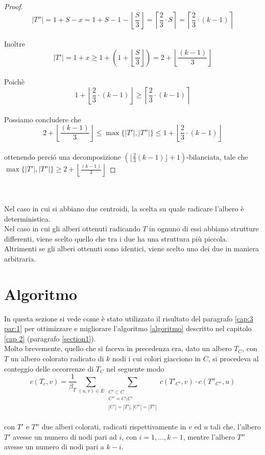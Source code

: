 \begin{proof}
\begin{equation}
|T''| = 1 + S - x = 1+S-1 - \left\lfloor \frac{S}{3}\right\rfloor = \left\lceil \frac{2}{3}\cdot S \right\rceil = \left\lceil \frac{2}{3} \cdot (k-1) \right\rceil 	
\end{equation}
\\
Inoltre
\\
\[ |T'| = 1+ x \ge 1+ (1 +  \left\lfloor \frac{S}{3}\right\rfloor ) = 2 +  \left\lfloor \frac{(k-1)}{3}\right\rfloor\]
\\
Poich\`e
\\
 	 \[1 + \left\lfloor \frac{2}{3} \cdot (k-1) \right\rfloor \ge \left\lceil \frac{2}{3} \cdot (k-1) \right\rceil \] 
 	 \\
Possiamo concludere che
\\
\[ 2 +  \left\lfloor \frac{(k-1)}{3}\right\rfloor \le \max\{|T'|,|T''|\} \le 1 + \left\lfloor \frac{2}{3} \cdot (k-1) \right\rfloor \]
 \\
ottenendo perci\'o una decomposizione $ (\lfloor \frac{2}{3}(k-1) \rfloor +1)$-bilanciata, tale che $ \max \{|T'|,|T''|\} \ge 2+ \left\lfloor \frac{(k-1)}{3}\right\rfloor $	 	 
\end{proof}\mbox{}\\\\
 	Nel caso in cui si abbiano due centroidi, la scelta su quale radicare l'albero  \`e deterministica.\\
 	Nel caso in cui gli alberi ottenuti radicando $ T $ in ognuno di essi abbiano strutture differenti, viene scelto quello che tra i due ha una struttura pi\`u piccola.
 	Altrimenti se gli alberi ottenuti sono identici, viene scelto uno dei due in maniera arbitraria.
 	
\section{Algoritmo}
\label{cap:3 par:2}
In questa sezione si vede come \`e stato utilizzato il risultato del paragrafo \ref{cap:3 par:1} per ottimizzare e migliorare l'algoritmo \ref{algoritmo} descritto nel capitolo \ref{cap 2} (paragrafo \ref{section1}).\\
Molto brevemente, quello che si faceva in precedenza era, dato un albero $ T_C $, con $ T $ un albero colorato radicato di $ k $ nodi i cui colori giacciono in $ C $, si procedeva al conteggio delle occorrenze di $ T_C $ nel seguente modo
\[	c(T_c,v)=\frac{1}{\beta_T}\sum_{(u,v)\in E}\sum_{\substack{C' \subset C \\C'' = C \setminus C' \\ |C'|=|T'|, |C''| = |T''|}}c(T'_{C'},v)\cdot c(T''_{C''},u) \]\\
con $ T' $ e $ T'' $ due alberi colorati, radicati rispettivamente in $ v $ ed $ u $ tali che, l'albero $ T' $ avesse un numero di nodi pari ad $ i $, con $ i = 1, \dots , k-1 $, mentre l'albero $ T'' $ avesse un numero di nodi pari a $ k-i $.


